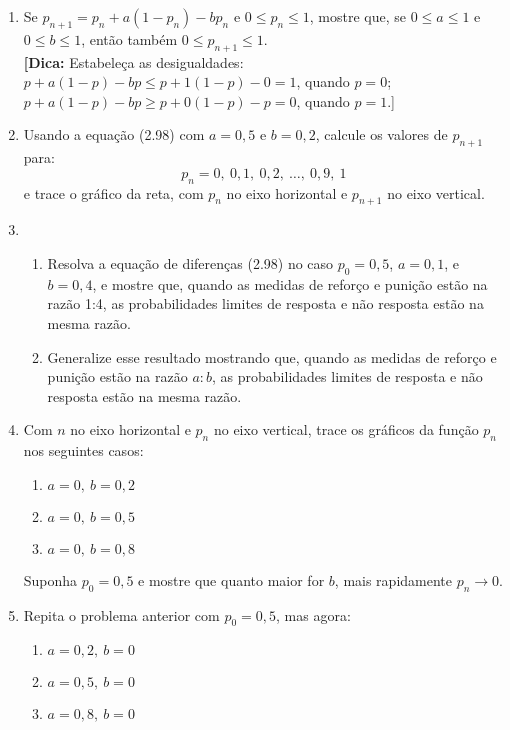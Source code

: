 \documentclass{article}
\begin{document}
\begin{enumerate}
  \item Se $p_{n+1} = p_n + a(1 - p_n) - b p_n$ e $0 \leq p_n \leq 1$, mostre que, se $0 \leq a \leq 1$ e $0 \leq b \leq 1$, então também $0 \leq p_{n+1} \leq 1$. \\
  \textbf{[Dica:} Estabeleça as desigualdades: \\
  $p + a(1 - p) - bp \leq p + 1(1 - p) - 0 = 1$, quando $p = 0$; \\
  $p + a(1 - p) - bp \geq p + 0(1 - p) - p = 0$, quando $p = 1$.]

  \item Usando a equação (2.98) com $a = 0{,}5$ e $b = 0{,}2$, calcule os valores de $p_{n+1}$ para:
  \[
  p_n = 0,\ 0{,}1,\ 0{,}2,\ \ldots,\ 0{,}9,\ 1
  \]
  e trace o gráfico da reta, com $p_n$ no eixo horizontal e $p_{n+1}$ no eixo vertical.

  \item 
  \begin{enumerate}
    \item Resolva a equação de diferenças (2.98) no caso $p_0 = 0{,}5$, $a = 0{,}1$, e $b = 0{,}4$, e mostre que, quando as medidas de reforço e punição estão na razão 1:4, as probabilidades limites de resposta e não resposta estão na mesma razão.
    \item Generalize esse resultado mostrando que, quando as medidas de reforço e punição estão na razão $a:b$, as probabilidades limites de resposta e não resposta estão na mesma razão.
  \end{enumerate}

  \item Com $n$ no eixo horizontal e $p_n$ no eixo vertical, trace os gráficos da função $p_n$ nos seguintes casos:
  \begin{enumerate}
    \item $a = 0,\ b = 0{,}2$
    \item $a = 0,\ b = 0{,}5$
    \item $a = 0,\ b = 0{,}8$
  \end{enumerate}
  Suponha $p_0 = 0{,}5$ e mostre que quanto maior for $b$, mais rapidamente $p_n \to 0$.

  \item Repita o problema anterior com $p_0 = 0{,}5$, mas agora:
  \begin{enumerate}
    \item $a = 0{,}2,\ b = 0$
    \item $a = 0{,}5,\ b = 0$
    \item $a = 0{,}8,\ b = 0$
  \end{enumerate}
\end{enumerate}
\end{document}
